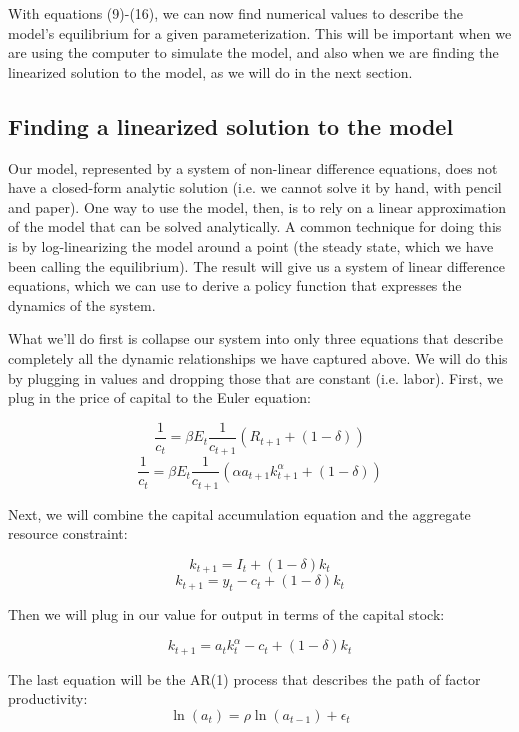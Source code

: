 \documentclass[12pt]{article}
\begin{document}
With equations (9)-(16), we can now find numerical values to describe the model's equilibrium for a given parameterization. This will be important when we are using the computer to simulate the model, and also when we are finding the linearized solution to the model, as we will do in the next section.

\subsection{Finding a linearized solution to the model}

Our model, represented by a system of non-linear difference equations, does not have a closed-form analytic solution (i.e. we cannot solve it by hand, with pencil and paper). One way to use the model, then, is to rely on a linear approximation of the model that can be solved analytically. A common technique for doing this is by log-linearizing the model around a point (the steady state, which we have been calling the equilibrium). The result will give us a system of linear difference equations, which we can use to derive a policy function that expresses the dynamics of the system.

What we'll do first is collapse our system into only three equations that describe completely all the dynamic relationships we have captured above. We will do this by plugging in values and dropping those that are constant (i.e. labor). First, we plug in the price of capital to the Euler equation:

\[ \frac{1}{c_t} = \beta E_t \frac{1}{c_{t+1}}(R_{t+1} + (1-\delta)) \]
\begin{equation}
\frac{1}{c_t} = \beta E_t \frac{1}{c_{t+1}}(\alpha a_{t+1} k_{t+1}^\alpha + (1-\delta))
\end{equation}

Next, we will combine the capital accumulation equation and the aggregate resource constraint:

\[ k_{t+1} = I_t + (1-\delta) k_t \]
\[ k_{t+1} = y_t - c_t + (1-\delta) k_t \]

Then we will plug in our value for output in terms of the capital stock:

\begin{equation}
k_{t+1} = a_t k_t^\alpha - c_t + (1-\delta) k_t 
\end{equation}

The last equation will be the AR(1) process that describes the path of factor productivity:
\begin{equation}
\ln(a_t) = \rho \ln(a_{t-1}) + \epsilon_t
\end{equation}
\end{document}
